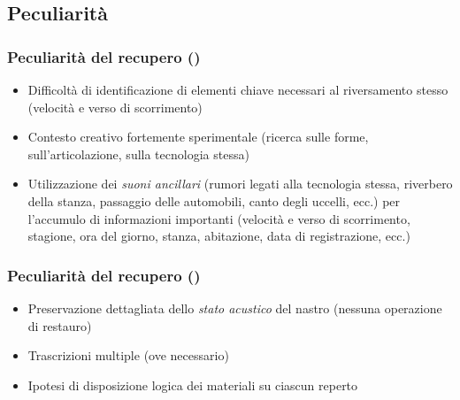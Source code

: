 \documentclass[compress,xcolor=dvipsnames]{beamer}
\begin{document}
\subsection{Peculiarit\`a}
\setcounter{ms}{1}
\begin{frame}
    \frametitle{Peculiarit\`a del recupero ()}

	
	\begin{itemize}%

		\item Difficolt\`a di identificazione di elementi chiave necessari al
		      riversamento stesso (velocit\`a e verso di scorrimento)

		\item Contesto creativo fortemente sperimentale (ricerca sulle forme,
		sull'articolazione, sulla tecnologia stessa)

		\item Utilizzazione dei \emph{suoni ancillari} (rumori legati alla
		tecnologia stessa, riverbero della stanza, passaggio delle automobili,
		canto degli uccelli, ecc.) per l'accumulo di informazioni importanti
		(velocit\`a e verso di scorrimento, stagione, ora del giorno, stanza,
		abitazione, data di registrazione, ecc.)

	\end{itemize}

\end{frame}

\begin{frame}
    \frametitle{Peculiarit\`a del recupero ()}
	
	\begin{itemize}%

		\item Preservazione dettagliata dello \emph{stato acustico} del
		      nastro (nessuna operazione di restauro)

    \item Trascrizioni multiple (ove necessario)

		\item Ipotesi di disposizione logica dei materiali su ciascun reperto

	\end{itemize}

\end{frame}
\end{document}
